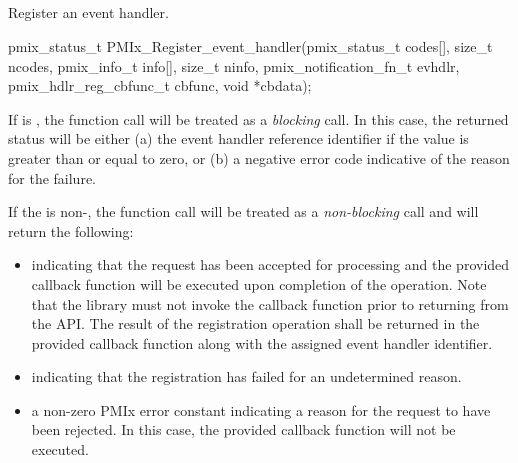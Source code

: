 \subsection{}

\summary

Register an event handler.

\format

\cspecificstart
\begin{codepar}
pmix_status_t
PMIx_Register_event_handler(pmix_status_t codes[], size_t ncodes,
                            pmix_info_t info[], size_t ninfo,
                            pmix_notification_fn_t evhdlr,
                            pmix_hdlr_reg_cbfunc_t cbfunc,
                            void *cbdata);
\end{codepar}
\cspecificend

\begin{arglist}
\end{arglist}


If  is , the function call will be treated as a \emph{blocking} call. In this case, the returned status will be either (a) the event handler reference identifier if the value is greater than or equal to zero, or (b) a negative error code indicative of the reason for the failure.

If the  is non-, the function call will be treated as a \emph{non-blocking} call and will return the following:

\begin{itemize}
\item {} indicating that the request has been accepted for processing and the provided callback function will be executed upon completion of the operation. Note that the library must not invoke the callback function prior to returning from the \ac{API}. The result of the registration operation shall be returned in the provided callback function along with the assigned event handler identifier.
\item {} indicating that the registration
has failed for an undetermined reason.
\item a non-zero \ac{PMIx} error constant indicating a reason for the request to have been rejected. In this case, the provided callback function will not be executed.
\end{itemize}

